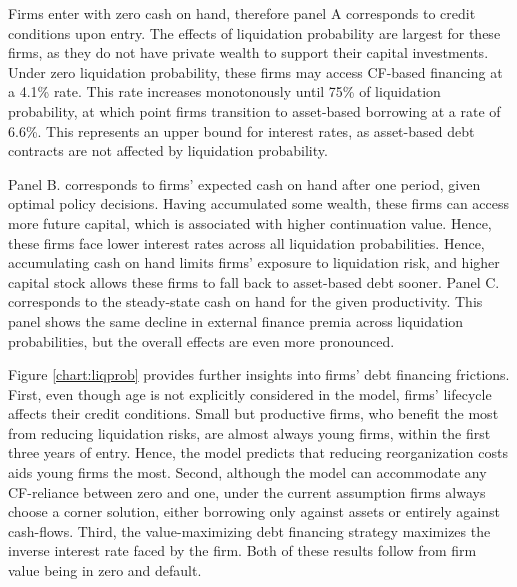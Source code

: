 \documentclass[12pt]{article}
\begin{document}
\noindent Firms enter with zero cash on hand, therefore panel A corresponds to credit conditions upon entry. The effects of liquidation probability are largest for these firms, as they do not have private wealth to support their capital investments. Under zero liquidation probability, these firms may access CF-based financing at a 4.1\% rate. This rate increases monotonously until 75\% of liquidation probability, at which point firms transition to asset-based borrowing at a rate of 6.6\%. This represents an upper bound for interest rates, as asset-based debt contracts are not affected by liquidation probability. 

Panel B. corresponds to firms' expected cash on hand after one period, given optimal policy decisions. Having accumulated some wealth, these firms can access more future capital, which is associated with higher continuation value. Hence, these firms face lower interest rates across all liquidation probabilities. Hence, accumulating cash on hand limits firms' exposure to liquidation risk, and higher capital stock allows these firms to fall back to asset-based debt sooner. Panel C. corresponds to the steady-state cash on hand for the given productivity. This panel shows the same decline in external finance premia across liquidation probabilities, but the overall effects are even more pronounced. 

Figure \ref{chart:liqprob} provides further insights into firms' debt financing frictions. First, even though age is not explicitly considered in the model, firms' lifecycle affects their credit conditions. Small but productive firms, who benefit the most from reducing liquidation risks, are almost always young firms, within the first three years of entry. Hence, the model predicts that reducing reorganization costs aids young firms the most. Second, although the model can accommodate any CF-reliance between zero and one, under the current assumption firms always choose a corner solution, either borrowing only against assets or entirely against cash-flows. Third, the value-maximizing debt financing strategy maximizes the inverse interest rate faced by the firm. Both of these results follow from firm value being in zero and default. 
\end{document}
